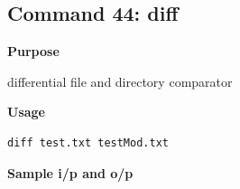 \subsection{Command 44: diff} 
\textbf{Purpose}
\begin{flushleft}
 differential file and directory comparator
\end{flushleft}
\textbf{Usage}
\begin{verbatim}
diff test.txt testMod.txt
\end{verbatim}
\textbf{Sample i/p and o/p}
\begin{figure}[H] 
\end{figure}
